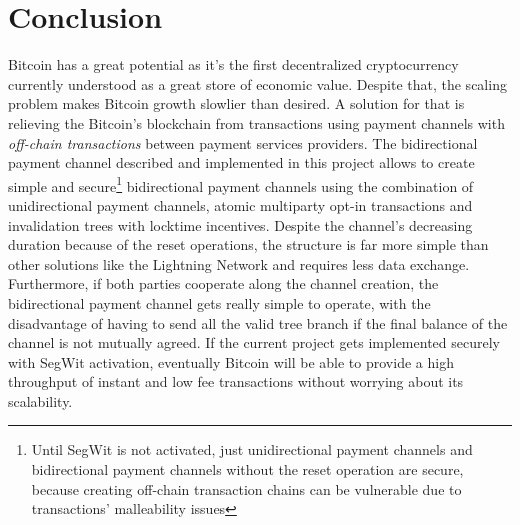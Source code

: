 \documentclass[12pt,journal,compsoc]{IEEEtran}
\begin{document}
\section{Conclusion}
Bitcoin has a great potential as it's the first decentralized cryptocurrency currently understood as a great store of economic value. Despite that, the scaling problem makes Bitcoin growth slowlier than desired. A solution for that is relieving the Bitcoin's blockchain from transactions using payment channels with \textit{off-chain transactions} between payment services providers\cite{bitcoin-psp:online}. The bidirectional payment channel described and implemented in this project allows to create simple and secure\footnote{Until SegWit\cite{segwit-org:online} is not activated, just unidirectional payment channels and bidirectional payment channels without the reset operation are secure, because creating off-chain transaction chains can be vulnerable due to transactions' malleability issues\cite{bitcoin-wiki-tx-malleability:online}} bidirectional payment channels using the combination of unidirectional payment channels, atomic multiparty opt-in transactions and invalidation trees with locktime incentives. Despite the channel's decreasing duration because of the reset operations, the structure is far more simple than other solutions like the Lightning Network\cite{poon2015bitcoin} and requires less data exchange. Furthermore, if both parties cooperate along the channel creation, the bidirectional payment channel gets really simple to operate, with the disadvantage of having to send all the valid tree branch if the final balance of the channel is not mutually agreed. If the current project gets implemented securely with SegWit\cite{segwit-org:online} activation, eventually Bitcoin will be able to provide a high throughput of instant and low fee transactions without worrying about its scalability.




%
\end{document}
